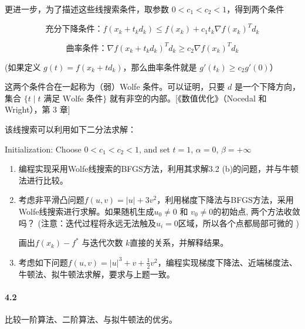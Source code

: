 \documentclass[12pt,a4paper]{article}
\begin{document}
更进一步，为了描述这些线搜索条件，取参数 $0<c_1<c_2<1$，得到两个条件


$$\textbf{充分下降条件：} f(x_k+t_k d_k) \leq f(x_k) +c_1t_k\nabla f(x_k)^T d_k$$

$$\textbf{曲率条件：} \nabla f(x_k+t_kd_k)^Td_k \geq c_2 \nabla f(x_k)^Td_k$$

(如果定义 $g(t)=f(x_k+td_k)$，那么曲率条件就是 $g'(t_k)\geq c_2 g'(0)$）

这两个条件合在一起称为（弱）Wolfe 条件。可以证明，只要 $d$ 是一个下降方向，集合 $\{t\;|\; t \text{ 满足 Wolfe 条件}\}$ 就有非空的内部。[《数值优化》（Nocedal 和 Wright），第 3 章]

该线搜索可以利用如下二分法求解：


\begin{algorithm}[H]
	\SetAlgoLined
	
	Initialization: Choose $0<c_1<c_2<1$, and set $t=1$, $\alpha=0$, $\beta=+\infty$\;
\end{algorithm}

\begin{enumerate}
	\item[(a)] 编程实现采用Wolfe线搜索的BFGS方法，利用其求解3.2 (b)的问题，并与牛顿法进行比较。
	
	\item[(b)] 考虑非平滑凸问题$f(u,v)=|u|+3v^2$，利用梯度下降法与BFGS方法，采用Wolfe线搜索进行求解。如果随机生成$u_0 \neq 0$ 和 $v_0 \neq 0$的初始点, 两个方法收敛吗？ (注意：迭代过程将永远无法触及$u_i=0$区域，所以各个点都局部可微的 )
	
	画出$f(x_k)- f^*$ 与迭代次数 $k$直接的关系，并解释结果。
	
	\item[(c)] 考虑如下问题$f(u,v)=|u|^3+v+\frac{1}{2}v^2$，编程实现梯度下降法、近端梯度法、牛顿法、拟牛顿法求解，要求与上题一致。
	
\end{enumerate}

\paragraph{4.2}
比较一阶算法、二阶算法、与拟牛顿法的优劣。
\end{document}
